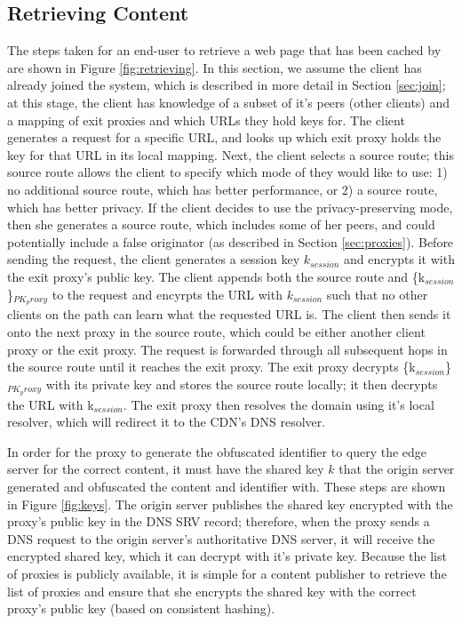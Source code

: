 \subsection{Retrieving Content}
\label{sec:retrieve}
The steps taken for an end-user to retrieve a web page that has been cached by \system{} are shown in Figure \ref{fig:retrieving}.  
In this section, we assume the client has already joined the system, which is described in more detail in Section \ref{sec:join}; at this 
stage, the client has knowledge of a subset of it's peers (other \system{} clients) and a mapping of exit proxies and which URLs they hold 
keys for.  The client generates a request for a specific URL, and looks up which exit proxy holds the key for that URL in its local mapping.  Next, 
the client selects a source route; this source route allows the client to specify which mode of \system{} they would like to use: 1) no additional source 
route, which has better performance, or 2) a source route, which has better privacy.  If the client decides to use the privacy-preserving mode, 
then she generates a source route, which includes some of her peers, and could potentially include a false originator (as described in Section \ref{sec:proxies}).
Before sending the request, the client generates a session key $k_{session}$ and encrypts it with the exit proxy's public key.  The client appends both the source route and \{k$_{session}$\}$_{PK_proxy}$ to the request and encyrpts the URL with $k_{session}$ such that no other clients on the path can learn what the requested URL is.  The client then sends it onto the next proxy in the source route, which could be either another client proxy or the exit proxy.  The request is forwarded 
through all subsequent hops in the source route until it reaches the exit proxy.  The exit proxy decrypts \{k$_{session}$\}$_{PK_proxy}$ with its private key and stores 
the source route locally; it then decrypts the URL with k$_{session}$.   The exit proxy then resolves the domain using it's local resolver, which will redirect it to the CDN's DNS resolver. 

In order for the proxy to generate the obfuscated identifier to query the edge server for the correct content, 
it must have the shared key $k$ that the origin server generated and obfuscated the content and identifier 
with.  These steps are shown in Figure \ref{fig:keys}.  The origin server publishes the shared key encrypted with the proxy's public key%
in the DNS SRV record; therefore, 
when the proxy sends a DNS request to the origin server's authoritative DNS server, it will receive the encrypted shared 
key, which it can decrypt with it's private key.  Because the list of \system{} proxies is publicly available, it is simple for a 
content publisher to retrieve the list of proxies and ensure that she encrypts the shared key with the correct proxy's public key (based on consistent hashing).

